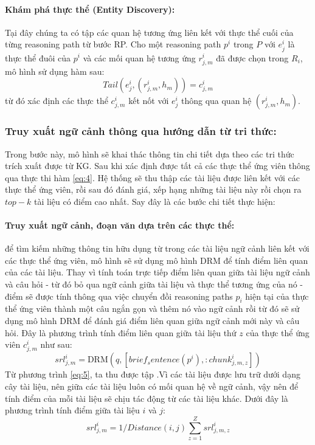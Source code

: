 \paragraph{Khám phá thực thể (Entity Discovery):} Tại đây chúng ta có tập các quan hệ tương ứng liên kết với thực thể cuối của từng reasoning path từ bước RP. Cho một reasoning path $p^i$ trong $P$ với $e^i_j$ là thực thể đuôi của $p^i$ và các mối quan hệ tương ứng $r^i_{j,m}$ đã được chọn trong $R_i$, mô hình sử dụng hàm sau:
\begin{equation}
    Tail(e^i_j, (r^i_{j,m}, h_m)) = c^i_{j,m}
    \label{eq:4}
\end{equation}
từ đó xác định các thực thể $c^i_{j,m}$ kết nốt với $e^i_j$ thông qua quan hệ $(r^i_{j,m}, h_m)$.


\subsubsection{Truy xuất ngữ cảnh thông qua hướng dẫn từ tri thức:}

Trong bước này, mô hình sẽ khai thác thông tin chi tiết dựa theo các tri thức trích xuất được từ KG. Sau khi xác định được tất cả các thực thể ứng viên thông qua thực thi hàm \ref{eq:4}. Hệ thống sẽ thu thập các tài liệu được liên kết với các thực thể ứng viên, rồi sau đó đánh giá, xếp hạng những tài liệu này rồi chọn ra $top-k$ tài liệu có điểm cao nhất. Say đây là các bước chi tiết thực hiện:
\paragraph{Truy xuất ngữ cảnh, đoạn văn dựa trên các thực thể:}
để tìm kiếm những thông tin hữu dụng từ trong các tài liệu ngữ cảnh liên kết với các thực thể ứng viên, mô hình sẽ sử dụng mô hình DRM để tính điểm liên quan của các tài liệu. Thay vì tính toán trực tiếp điểm liên quan giữa tài liệu ngữ cảnh và câu hỏi - từ đó bỏ qua ngữ cảnh giữa tài liệu và thực thể tương ứng của nó - điểm sẽ được tính thông qua việc chuyển đồi reasoning paths $p_i$ hiện tại của thực thể ứng viên thành một câu ngắn gọn và thêm nó vào ngữ cảnh rồi từ đó sẽ sử dụng mô hình DRM để đánh giá điểm liên quan giữa ngữ cảnh mới này và câu hỏi. Đây là phương trình tính điểm liên quan giữa tài liệu thứ $z$ của thực thể ứng viên $c^i_{j,m}$ như sau:
\begin{equation}
    srl^i_{j,m} = \text{DRM}(q, [brief_sentence(p^i), :chunk^i_{j,m,z}])
    \label{eq:5}
\end{equation}
Từ phương trình \ref{eq:5}, ta thu được tập .Vì các tài liệu được lưu trữ dưới dạng cây tài liệu, nên giữa các tài liệu luôn có mối quan hệ về ngữ cảnh, vậy nên để tính điểm của mỗi tài liệu sẽ chịu tác động từ các tài liệu khác. Dưới đây là phương trình tính điểm giữa tài liệu $i$ và $j$:
\begin{equation}
    srl^i_{j,m} = 1/Distance(i, j) \sum_{z=1}^{Z} srl^i_{j,m,z}
\end{equation}

